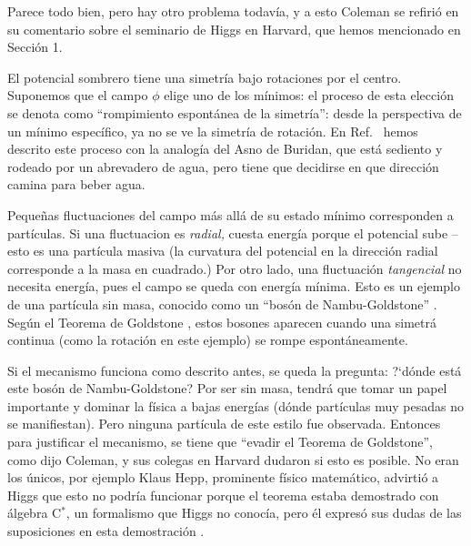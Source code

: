 Parece todo bien, pero hay otro problema todav\'ia, y a esto
Coleman se refiri\'o en su comentario sobre el seminario de
Higgs en Harvard, que hemos mencionado en Secci\'on 1.

El potencial sombrero tiene una simetr\'ia bajo rotaciones por
el centro. Suponemos que el campo $\phi$ elige uno de
los m\'inimos: el proceso de esta elecci\'on se denota como
``rompimiento espont\'anea de la simetr\'ia'': desde
la perspectiva de un m\'inimo espec\'ifico, ya no se ve la
simetr\'ia de rotaci\'on. En Ref.\ \cite{HiggsBol} hemos
descrito este proceso con la analog\'ia del Asno de Buridan,
que est\'a sediento y rodeado por un abrevadero de agua, pero
tiene que decidirse en que direcci\'on camina para beber agua.

Peque\~nas fluctuaciones del campo m\'as all\'a de su estado
m\'inimo corresponden a part\'iculas. Si una fluctuacion es
{\em radial,} cuesta energ\'ia porque el potencial sube -- esto
es una part\'icula masiva (la curvatura del potencial en la
direcci\'on radial corresponde a la masa en cuadrado.)
Por otro lado, una fluctuaci\'on {\em tangencial} no necesita
energ\'ia, pues el campo se queda con energ\'ia m\'inima.
Esto es un ejemplo de una part\'icula sin masa, conocido
como un ``bos\'on de Nambu-Goldstone'' \cite{Nambu,Goldstone}.
Seg\'un el Teorema de Goldstone \cite{GSW}, estos bosones aparecen
cuando una simetr\'a continua (como la rotaci\'on en este
ejemplo) se rompe espont\'aneamente.

Si el mecanismo funciona como descrito antes, se queda la
pregunta: ?`d\'onde est\'a este bos\'on de Nambu-Goldstone?
Por ser sin masa, tendr\'a que tomar un papel importante
y dominar la f\'isica a bajas energ\'ias (d\'onde part\'iculas
muy pesadas no se manifiestan). Pero ninguna part\'icula de
este estilo fue observada. Entonces para justificar el mecanismo,
se tiene que ``evadir el Teorema de Goldstone'', como dijo
Coleman, y sus colegas en Harvard dudaron si esto es posible.
No eran los \'unicos, por ejemplo Klaus Hepp, prominente
f\'isico matem\'atico, advirti\'o a Higgs que esto no podr\'ia
funcionar porque el teorema estaba demostrado con \'algebra
C$^{*}$, un formalismo que Higgs no conoc\'ia, pero \'el expres\'o
sus dudas de las suposiciones en esta demostraci\'on \cite{boson}.

